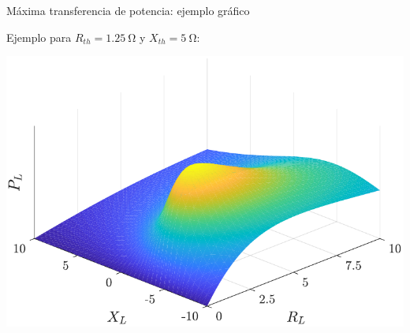 \documentclass[aspectratio=169, usenames,svgnames,dvipsnames]{beamer}
\begin{document}

\begin{frame}{Máxima transferencia de potencia: \hspace{3mm}ejemplo gráfico}

\vspace{1mm}
Ejemplo para $R_{th}=\qty{1,25}{\ohm}$ y $X_{th}=\qty{5}{\ohm}$:

    \vspace{-3.5mm}
    \begin{center}
        \includegraphics[height=0.8\textheight]{../figs/max_pot_Z_L.pdf}
    \end{center}
    
\end{frame}
\end{document}
